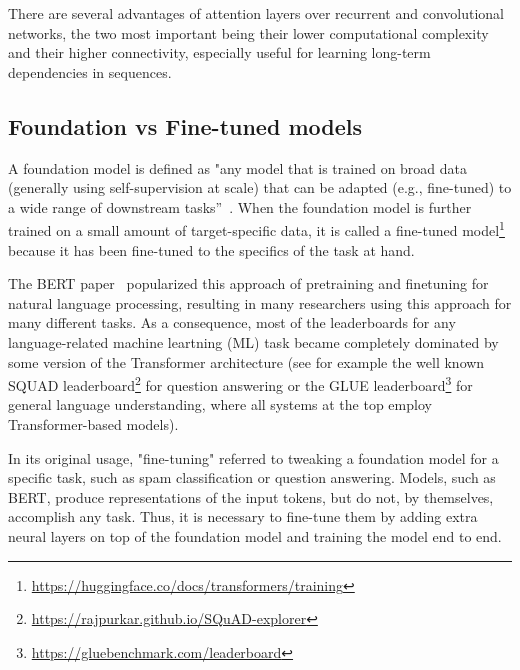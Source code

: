 \documentclass{article}
\begin{document}
There are several advantages of attention layers over recurrent and convolutional networks, the two most important being their lower computational complexity and their higher connectivity, especially useful for learning long-term dependencies in sequences.

\subsection{Foundation vs Fine-tuned models}

A foundation model is defined as "any model that is trained on broad data (generally using self-supervision at scale) that can be adapted (e.g., fine-tuned) to a wide range of downstream tasks”~. When the foundation model is further trained on a small amount of target-specific data, it is called a fine-tuned model\footnote{\url{https://huggingface.co/docs/transformers/training}} because it has been fine-tuned to the specifics of the task at hand.

The BERT paper~ popularized this approach of pretraining and finetuning for natural language processing, resulting in many researchers using this approach for many different tasks. As a consequence, most of the leaderboards for any language-related machine leartning (ML) task became completely dominated by some version of the Transformer architecture (see for example the well known SQUAD leaderboard\footnote{\url{https://rajpurkar.github.io/SQuAD-explorer}} for question answering or the GLUE leaderboard\footnote{\url{https://gluebenchmark.com/leaderboard}} for general language understanding, where all systems at the top employ Transformer-based models).

In its original usage, "fine-tuning" referred to tweaking a foundation model for a specific task, such as spam classification or question answering. Models, such as BERT, produce representations of the input tokens, but do not, by themselves, accomplish any task. Thus, it is necessary to fine-tune them by adding extra neural layers on top of the foundation model and training the model end to end. 
\end{document}
